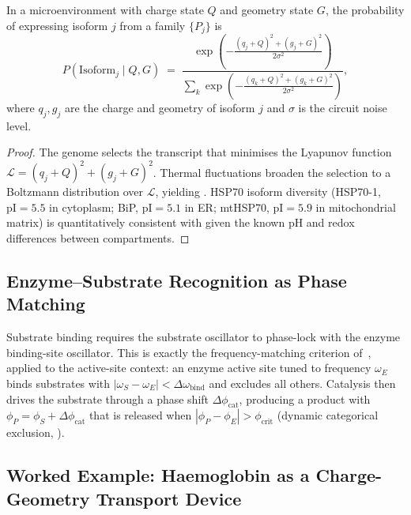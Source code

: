 \begin{theorem}
\label{thm:ch03-isoform-selection}
In a microenvironment with charge state $Q$ and geometry state $G$, the
probability of expressing isoform $j$ from a family $\{P_j\}$ is
\begin{equation}
    P(\mathrm{Isoform}_j\mid Q,G)
    \;=\;
    \frac{\exp\!\left(-\tfrac{(q_j+Q)^2+(g_j+G)^2}{2\sigma^2}\right)}
         {\displaystyle\sum_k\exp\!\left(-\tfrac{(q_k+Q)^2+(g_k+G)^2}{2\sigma^2}\right)},
    \label{eq:ch03-isoform}
\end{equation}
where $q_j,g_j$ are the charge and geometry of isoform $j$ and $\sigma$ is
the circuit noise level.
\end{theorem}

\begin{proof}
The genome selects the transcript that minimises the Lyapunov function
$\mathcal{L}=(q_j+Q)^2+(g_j+G)^2$.  Thermal fluctuations broaden the
selection to a Boltzmann distribution over $\mathcal{L}$, yielding
.  HSP70 isoform diversity (HSP70-1,
$\mathrm{pI}=5.5$ in cytoplasm; BiP, $\mathrm{pI}=5.1$ in ER;
mtHSP70, $\mathrm{pI}=5.9$ in mitochondrial matrix) is quantitatively
consistent with  given the known pH and redox
differences between compartments.
\end{proof}

\subsection{Enzyme--Substrate Recognition as Phase Matching}

Substrate binding requires the substrate oscillator to phase-lock with the
enzyme binding-site oscillator.  This is exactly the frequency-matching
criterion of~, applied to the active-site
context: an enzyme active site tuned to frequency $\omega_E$ binds
substrates with $|\omega_S-\omega_E|<\Delta\omega_{\mathrm{bind}}$ and
excludes all others.  Catalysis then drives the substrate through a
phase shift $\Delta\phi_{\mathrm{cat}}$, producing a product with
$\phi_P=\phi_S+\Delta\phi_{\mathrm{cat}}$ that is released when
$|\phi_P-\phi_E|>\phi_{\mathrm{crit}}$ (dynamic categorical exclusion,
).

\subsection{Worked Example: Haemoglobin as a Charge-Geometry Transport Device}

